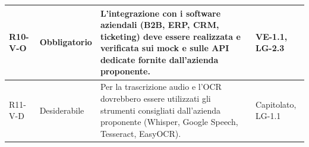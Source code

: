 {\begin{longtable}{|>{\raggedright\arraybackslash}p{1.8cm}|>{\raggedright\arraybackslash}p{2.3cm}|>{\raggedright\arraybackslash}p{6.6cm}|>{\raggedright\arraybackslash}p{3.1cm}|}
    \mbox{R10-V-O} & Obbligatorio & L'integrazione con i software aziendali (B2B, ERP, CRM, ticketing) deve essere realizzata e verificata sui mock e sulle API dedicate fornite dall'azienda proponente. & \mbox{VE-1.1}, \mbox{LG-2.3} \\ \hline
    \mbox{R11-V-D} & Desiderabile & Per la trascrizione audio e l'OCR dovrebbero essere utilizzati gli strumenti consigliati dall'azienda proponente (Whisper, Google Speech, Tesseract, EasyOCR). & \mbox{Capitolato}, \mbox{LG-1.1} \\ \hline
    \end{longtable}
}
